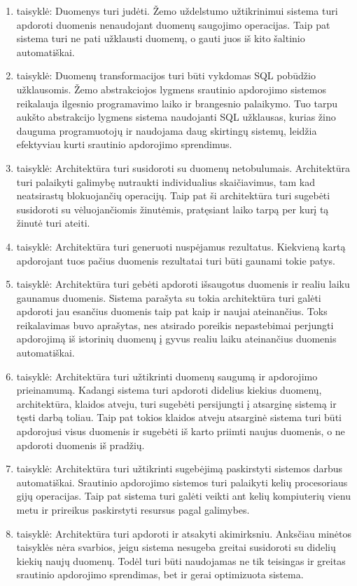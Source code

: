 \documentclass{VUMIFPSkursinis}
\begin{document}
\begin{enumerate}[label=\arabic*]
    \item taisyklė: Duomenys turi judėti. Žemo uždelstumo užtikrinimui sistema turi apdoroti duomenis nenaudojant duomenų saugojimo operacijas. Taip pat sistema turi ne pati užklausti duomenų, o gauti juos
    iš kito šaltinio automatiškai. 
    \item taisyklė: Duomenų transformacijos turi būti vykdomas SQL pobūdžio užklausomis. Žemo abstrakciojos lygmens srautinio apdorojimo sistemos reikalauja ilgesnio 
    programavimo laiko ir brangesnio palaikymo. Tuo tarpu aukšto abstrakcijo lygmens sistema 
    naudojanti SQL užklausas, kurias žino dauguma programuotojų ir naudojama daug skirtingų sistemų, leidžia efektyviau kurti srautinio apdorojimo sprendimus.
    \item taisyklė: Architektūra turi susidoroti su duomenų netobulumais. Architektūra turi palaikyti galimybę nutraukti individualius skaičiavimus, tam kad neatsirastų blokuojančių operacijų. Taip pat ši 
    architektūra turi sugebėti susidoroti su vėluojančiomis žinutėmis, pratęsiant laiko tarpą per kurį tą žinutė turi ateiti.
    \item taisyklė: Architektūra turi generuoti nuspėjamus rezultatus. Kiekvieną kartą apdorojant tuos pačius duomenis rezultatai turi būti gaunami tokie patys.
    \item taisyklė: Architektūra turi gebėti apdoroti išsaugotus duomenis ir realiu laiku gaunamus duomenis. Sistema parašyta su tokia architektūra turi galėti apdoroti jau esančius duomenis taip pat kaip ir 
    naujai ateinančius. Toks reikalavimas buvo aprašytas, nes atsirado poreikis nepastebimai perjungti apdorojimą iš istorinių duomenų į gyvus realiu laiku ateinančius duomenis automatiškai.
    \item taisyklė: Architektūra turi užtikrinti duomenų saugumą ir apdorojimo prieinamumą. Kadangi sistema turi apdoroti didelius kiekius duomenų, architektūra, klaidos atveju, turi sugebėti persijungti į atsarginę
    sistemą ir tęsti darbą toliau. Taip pat tokios klaidos atveju atsarginė sistema turi būti apdorojusi visus duomenis ir sugebėti iš karto priimti naujus duomenis, o ne apdoroti duomenis iš pradžių.
    \item taisyklė: Architektūra turi užtikrinti sugebėjimą paskirstyti sistemos darbus automatiškai. Srautinio apdorojimo sistemos turi palaikyti kelių procesoriaus gijų operacijas. Taip pat sistema turi galėti 
    veikti ant kelių kompiuterių vienu metu ir prireikus paskirstyti resursus pagal galimybes.
    \item taisyklė: Architektūra turi apdoroti ir atsakyti akimirksniu. Anksčiau minėtos taisyklės nėra svarbios, jeigu sistema nesugeba greitai susidoroti su didelių kiekių naujų duomenų. 
    Todėl turi būti naudojamas ne tik teisingas ir greitas srautinio apdorojimo sprendimas, bet ir gerai optimizuota sistema.
\end{enumerate}\par
\end{document}
